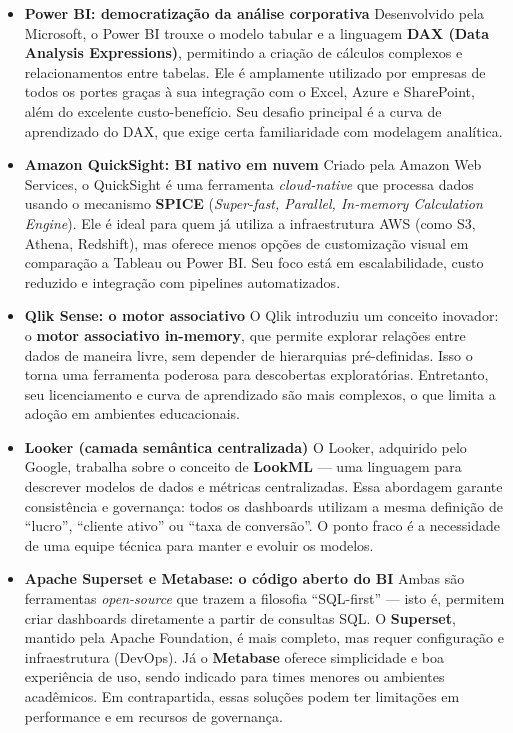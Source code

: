 \begin{itemize}[leftmargin=*]

  \item \textbf{Power BI: democratização da análise corporativa}  
  Desenvolvido pela Microsoft, o Power BI trouxe o modelo tabular e a linguagem \textbf{DAX (Data Analysis Expressions)}, permitindo a criação de cálculos complexos e relacionamentos entre tabelas.  
  Ele é amplamente utilizado por empresas de todos os portes graças à sua integração com o Excel, Azure e SharePoint, além do excelente custo-benefício.  
  Seu desafio principal é a curva de aprendizado do DAX, que exige certa familiaridade com modelagem analítica.

  \item \textbf{Amazon QuickSight: BI nativo em nuvem}  
  Criado pela Amazon Web Services, o QuickSight é uma ferramenta \textit{cloud-native} que processa dados usando o mecanismo \textbf{SPICE} (\textit{Super-fast, Parallel, In-memory Calculation Engine}).  
  Ele é ideal para quem já utiliza a infraestrutura AWS (como S3, Athena, Redshift), mas oferece menos opções de customização visual em comparação a Tableau ou Power BI.  
  Seu foco está em escalabilidade, custo reduzido e integração com pipelines automatizados.

  \item \textbf{Qlik Sense: o motor associativo}  
  O Qlik introduziu um conceito inovador: o \textbf{motor associativo in-memory}, que permite explorar relações entre dados de maneira livre, sem depender de hierarquias pré-definidas.  
  Isso o torna uma ferramenta poderosa para descobertas exploratórias. Entretanto, seu licenciamento e curva de aprendizado são mais complexos, o que limita a adoção em ambientes educacionais.

  \item \textbf{Looker (camada semântica centralizada)}  
  O Looker, adquirido pelo Google, trabalha sobre o conceito de \textbf{LookML} — uma linguagem para descrever modelos de dados e métricas centralizadas.  
  Essa abordagem garante consistência e governança: todos os dashboards utilizam a mesma definição de “lucro”, “cliente ativo” ou “taxa de conversão”.  
  O ponto fraco é a necessidade de uma equipe técnica para manter e evoluir os modelos.

  \item \textbf{Apache Superset e Metabase: o código aberto do BI}  
  Ambas são ferramentas \textit{open-source} que trazem a filosofia “SQL-first” — isto é, permitem criar dashboards diretamente a partir de consultas SQL.  
  O \textbf{Superset}, mantido pela Apache Foundation, é mais completo, mas requer configuração e infraestrutura (DevOps). Já o \textbf{Metabase} oferece simplicidade e boa experiência de uso, sendo indicado para times menores ou ambientes acadêmicos.  
  Em contrapartida, essas soluções podem ter limitações em performance e em recursos de governança.

\end{itemize}

